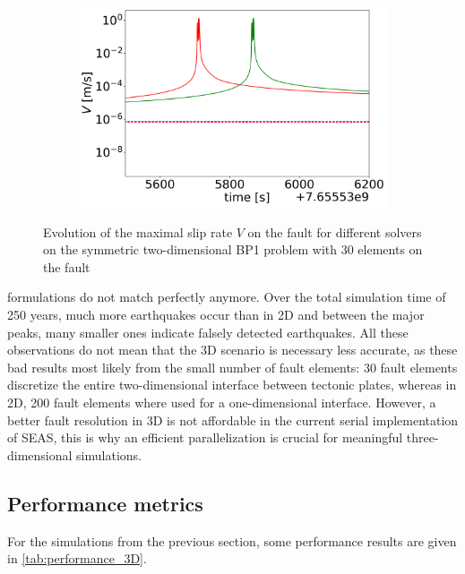 \begin{figure}[H]
\begin{subfigure}[b]{0.32\textwidth}
		\centering
		\includegraphics[width=1\textwidth]{images/TANDEMtimeEvolution_3D_maxSlipRate_allFormulations_LastEarthquake_Explicit.png}
	\end{subfigure}
	\caption{Evolution of the maximal slip rate $V$ on the fault for different solvers on the symmetric two-dimensional BP1 problem with 30 elements on the fault}
	\label{fig:timeEvolutionTANDEM_V_3D}
\end{figure}

\noindent formulations do not match perfectly anymore. Over the total simulation time of 250 years, much more earthquakes occur than in 2D and between the major peaks, many smaller ones indicate falsely detected earthquakes. All these observations do not mean that the 3D scenario is necessary less accurate, as these bad results most likely from the small number of fault elements: 30 fault elements discretize the entire two-dimensional interface between tectonic plates, whereas in 2D, 200 fault elements where used for a one-dimensional interface. However, a better fault resolution in 3D is not affordable in the current serial implementation of SEAS, this is why an efficient parallelization is crucial for meaningful three-dimensional simulations.

\subsection{Performance metrics}
For the simulations from the previous section, some performance results are given in \autoref{tab:performance_3D}. 

